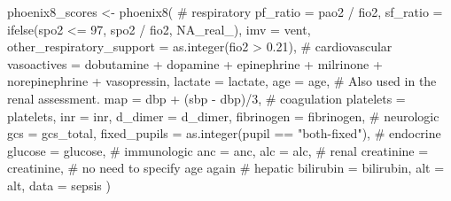 \documentclass[
  letterpaper,
  DIV=11,
  numbers=noendperiod]{scrartcl}
\newenvironment{Shaded}{\begin{snugshade}}{\end{snugshade}}
\newcommand{\AttributeTok}[1]{\textcolor[rgb]{0.40,0.45,0.13}{#1}}
\newcommand{\CommentTok}[1]{\textcolor[rgb]{0.37,0.37,0.37}{#1}}
\newcommand{\ConstantTok}[1]{\textcolor[rgb]{0.56,0.35,0.01}{#1}}
\newcommand{\DecValTok}[1]{\textcolor[rgb]{0.68,0.00,0.00}{#1}}
\newcommand{\FloatTok}[1]{\textcolor[rgb]{0.68,0.00,0.00}{#1}}
\newcommand{\FunctionTok}[1]{\textcolor[rgb]{0.28,0.35,0.67}{#1}}
\newcommand{\NormalTok}[1]{\textcolor[rgb]{0.00,0.23,0.31}{#1}}
\newcommand{\OtherTok}[1]{\textcolor[rgb]{0.00,0.23,0.31}{#1}}
\newcommand{\SpecialCharTok}[1]{\textcolor[rgb]{0.37,0.37,0.37}{#1}}
\newcommand{\StringTok}[1]{\textcolor[rgb]{0.13,0.47,0.30}{#1}}
\begin{document}
\begin{Shaded}
\begin{Highlighting}[]
\NormalTok{phoenix8\_scores }\OtherTok{\textless{}{-}}
  \FunctionTok{phoenix8}\NormalTok{(}
    \CommentTok{\# respiratory}
      \AttributeTok{pf\_ratio =}\NormalTok{ pao2 }\SpecialCharTok{/}\NormalTok{ fio2,}
      \AttributeTok{sf\_ratio =} \FunctionTok{ifelse}\NormalTok{(spo2 }\SpecialCharTok{\textless{}=} \DecValTok{97}\NormalTok{, spo2 }\SpecialCharTok{/}\NormalTok{ fio2, }\ConstantTok{NA\_real\_}\NormalTok{),}
      \AttributeTok{imv =}\NormalTok{ vent,}
      \AttributeTok{other\_respiratory\_support =} \FunctionTok{as.integer}\NormalTok{(fio2 }\SpecialCharTok{\textgreater{}} \FloatTok{0.21}\NormalTok{),}
    \CommentTok{\# cardiovascular}
      \AttributeTok{vasoactives =}\NormalTok{ dobutamine }\SpecialCharTok{+}\NormalTok{ dopamine }\SpecialCharTok{+}\NormalTok{ epinephrine }\SpecialCharTok{+}\NormalTok{ milrinone }\SpecialCharTok{+}
\NormalTok{                    norepinephrine }\SpecialCharTok{+}\NormalTok{ vasopressin,}
      \AttributeTok{lactate =}\NormalTok{ lactate,}
      \AttributeTok{age =}\NormalTok{ age, }\CommentTok{\# Also used in the renal assessment.}
      \AttributeTok{map =}\NormalTok{ dbp }\SpecialCharTok{+}\NormalTok{ (sbp }\SpecialCharTok{{-}}\NormalTok{ dbp)}\SpecialCharTok{/}\DecValTok{3}\NormalTok{,}
    \CommentTok{\# coagulation}
      \AttributeTok{platelets =}\NormalTok{ platelets,}
      \AttributeTok{inr =}\NormalTok{ inr,}
      \AttributeTok{d\_dimer =}\NormalTok{ d\_dimer,}
      \AttributeTok{fibrinogen =}\NormalTok{ fibrinogen,}
    \CommentTok{\# neurologic}
      \AttributeTok{gcs =}\NormalTok{ gcs\_total,}
      \AttributeTok{fixed\_pupils =} \FunctionTok{as.integer}\NormalTok{(pupil }\SpecialCharTok{==} \StringTok{"both{-}fixed"}\NormalTok{),}
    \CommentTok{\# endocrine}
      \AttributeTok{glucose =}\NormalTok{ glucose,}
    \CommentTok{\# immunologic}
      \AttributeTok{anc =}\NormalTok{ anc,}
      \AttributeTok{alc =}\NormalTok{ alc,}
    \CommentTok{\# renal}
      \AttributeTok{creatinine =}\NormalTok{ creatinine,}
      \CommentTok{\# no need to specify age again}
    \CommentTok{\# hepatic}
      \AttributeTok{bilirubin =}\NormalTok{ bilirubin,}
      \AttributeTok{alt =}\NormalTok{ alt,}
    \AttributeTok{data =}\NormalTok{ sepsis}
\NormalTok{  )}


\end{Highlighting}
\end{Shaded}
\end{document}

